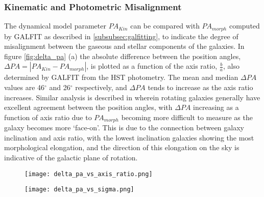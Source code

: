 \documentclass[fleqn,usenatbib]{mn2e}
\begin{document}
\subsubsection{Kinematic and Photometric Misalignment}\label{subsubsec:kin_misalignment}
The dynamical model parameter $PA_{Kin}$ can be compared with $PA_{morph}$ computed by GALFIT as described in \cref{subsubsec:galfitting}, to indicate the degree of misalignment between the gaseous and stellar components of the galaxies.
In figure \ref{fig:delta_pa} (a) the absolute difference between the position angles, $\Delta PA = |PA_{Kin}-PA_{morph}|$, is plotted as a function of the axis ratio, $\frac{b}{a}$, also determined by GALFIT from the HST photometry.
The mean and median $\Delta PA$ values are 46$^{\circ}$ and 26$^{\circ}$ respectively, and $\Delta PA$ tends to increase as the axis ratio increases.
Similar analysis is described in \citep[e.g.][]{Epinat2012,Wisnioski2015,Harrison2017} wherein rotating galaxies generally have excellent agreement between the position angles, with $\Delta PA$ increasing as a function of axis ratio due to $PA_{morph}$ becoming more difficult to measure as the galaxy becomes more `face-on'.
This is due to the connection between galaxy inclination and axis ratio, with the lowest inclination galaxies showing the most morphological elongation, and the direction of this elongation on the sky is indicative of the galactic plane of rotation.

\begin{figure*}
    \centering \hspace{-1.3cm}
    \begin{subfigure}[h!]{0.5\textwidth}
        \centering
        \texttt{[image: delta\_pa\_vs\_axis\_ratio.png]}
    \end{subfigure} \hspace{0.4cm}
    \begin{subfigure}[h!]{0.5\textwidth}
        \centering
        \texttt{[image: delta\_pa\_vs\_sigma.png]}
    \end{subfigure}
    \caption{The absolute difference between $PA_{morph}$ and $PA_{kin}$, $\Delta PA$, is plotted in panel (a) against the GALFIT determined galactic minor to major axis ratio for all KDS galaxies with both HST coverage and dynamical modelling.
The median difference computed in bins of 0.2 x-axis width and the standard deviation in each of these bins are also plotted as the black line and light blue shaded region respectively.
The misalignment clearly increases as a function of axis ratio, but is also generally larger than reported in previous IFU studies at lower redshift, as described throughout the text.
In panel (b) we explore the possibility that the photometric and kinematic misalignment may be a function of the observed velocity dispersion.
There appears to be some suggestion that with increasing $\sigma_{obs}$, larger $\Delta PA$ are observed but we do not quantify this connection and conclude only that the elevated velocity dispersions at high redshift could be a contributing factor in increasing the misalignment between the two axes.}
    \label{fig:delta_pa}
\end{figure*}
\end{document}
